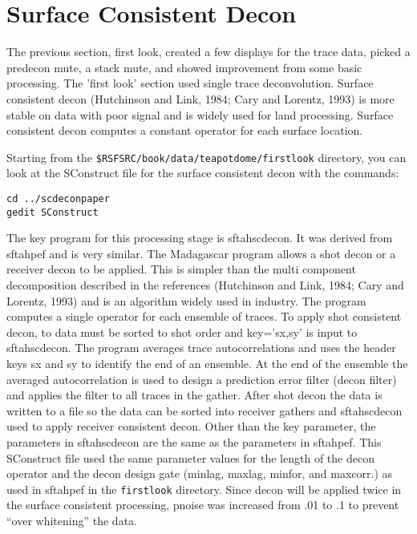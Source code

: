 

\section{Surface Consistent Decon}
The previous section, first look, created a few displays for the trace data, picked a predecon mute, a stack mute, and showed improvement from some basic processing.  The 'first look' section used single trace deconvolution.  Surface consistent decon (Hutchinson and Link, 1984; Cary and Lorentz, 1993) is more stable on data with poor signal and is widely used for land processing.  Surface consistent decon computes a constant operator for each surface location.  

Starting from the \texttt{\$RSFSRC/book/data/teapotdome/firstlook} directory, you can look at the SConstruct file for the surface consistent decon with the commands:
\begin{verbatim}
cd ../scdeconpaper
gedit SConstruct
\end{verbatim}

The key program for this processing stage is sftahscdecon.  It was derived from sftahpef and is very similar.  The Madagascar program allows a shot decon or a receiver decon to be applied.  This is simpler than the multi component decomposition described in the references  (Hutchinson and Link, 1984; Cary and Lorentz, 1993) and is an algorithm widely used in industry.  The program computes a single operator for each ensemble of traces.  To apply shot consistent decon, to data must be sorted to shot order and key='sx,sy' is input to sftahscdecon.  The program averages trace autocorrelations and uses the header keys sx and sy to identify the end of an ensemble.  At the end of the ensemble the averaged autocorrelation is used to design a prediction error filter (decon filter) and applies the filter to all traces in the gather.  After shot decon the data is written to a file so the data can be sorted into receiver gathers and sftahscdecon used to apply receiver consistent decon.  Other than the key parameter, the parameters in sftahscdecon are the same as the parameters in sftahpef.  This SConstruct file used the same parameter values for the length of the decon operator and the decon design gate (minlag, maxlag, minfor, and maxcorr.) as used in sftahpef in the \texttt{firstlook} directory.  Since decon will be applied twice in the surface consistent processing, pnoise was increased from .01 to .1 to prevent “over whitening”  the data.

